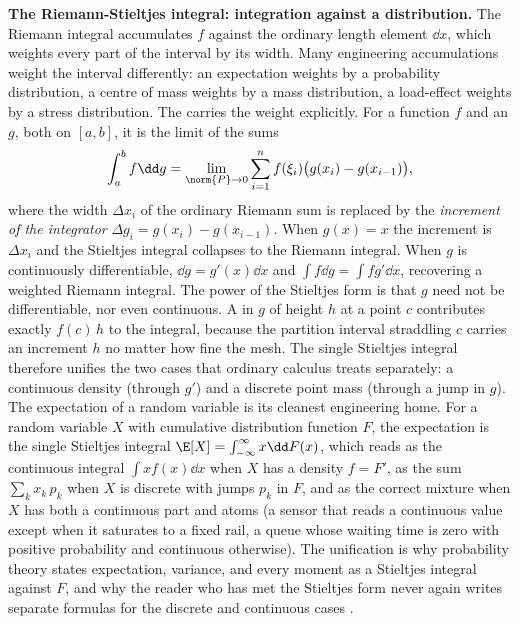 \begin{mastery}
\textbf{The Riemann-Stieltjes integral: integration against a
distribution.} The Riemann integral accumulates $f$ against the
ordinary length element $\dd x$, which weights every part of the
interval by its width. Many engineering accumulations weight the
interval differently: an expectation weights by a probability
distribution, a centre of mass weights by a mass distribution, a
load-effect weights by a stress distribution. The
 carries the weight explicitly. For
a function $f$ and an  $g$, both on $[a, b]$, it is
the limit of the sums
\[
\int_{a}^{b} f\dd g = \lim_{\norm{P}\to 0}\sum_{i=1}^{n}
f(\xi_{i})\bigl(g(x_{i}) - g(x_{i-1})\bigr),
\]
where the width $\Delta x_{i}$ of the ordinary Riemann sum is replaced
by the \emph{increment of the integrator} $\Delta g_{i} = g(x_{i}) -
g(x_{i-1})$. When $g(x) = x$ the increment is $\Delta x_{i}$ and the
Stieltjes integral collapses to the Riemann integral. When $g$ is
continuously differentiable, $\dd g = g'(x)\dd x$ and $\int f\dd g =
\int f g'\dd x$, recovering a weighted Riemann integral. The power of
the Stieltjes form is that $g$ need not be differentiable, nor even
continuous. A  in $g$ of height $h$ at a point $c$
contributes exactly $f(c)\,h$ to the integral, because the partition
interval straddling $c$ carries an increment $h$ no matter how fine the
mesh. The single Stieltjes integral therefore unifies the two cases
that ordinary calculus treats separately: a continuous density
(through $g'$) and a discrete point mass (through a jump in $g$). The
expectation of a random variable is its cleanest engineering home. For
a random variable $X$ with cumulative distribution function $F$, the
expectation is the single Stieltjes integral $\E[X] = \int_{-\infty}
^{\infty} x\dd F(x)$, which reads as the continuous integral
$\int x f(x)\dd x$ when $X$ has a density $f = F'$, as the sum
$\sum_{k} x_{k}\,p_{k}$ when $X$ is discrete with jumps $p_{k}$ in $F$,
and as the correct mixture when $X$ has both a continuous part and
atoms (a sensor that reads a continuous value except when it saturates
to a fixed rail, a queue whose waiting time is zero with positive
probability and continuous otherwise). The unification is why
probability theory states expectation, variance, and every moment as a
Stieltjes integral against $F$, and why the reader who has met the
Stieltjes form never again writes separate formulas for the discrete
and continuous cases \cite{text:v2ch06-apostol-calculus}.
\end{mastery}


